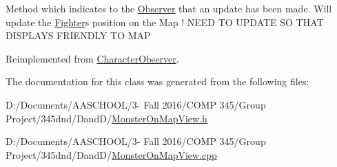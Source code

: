 Method which indicates to the \hyperlink{class_observer}{Observer} that an update has been made. Will update the \hyperlink{class_fighter}{Fighter}\textquotesingle{}s position on the Map ! N\+E\+ED TO U\+P\+D\+A\+TE SO T\+H\+AT D\+I\+S\+P\+L\+A\+YS F\+R\+I\+E\+N\+D\+LY TO M\+AP 

Reimplemented from \hyperlink{class_character_observer_a398d6d784065c7ed36c928d44a574630}{Character\+Observer}.



The documentation for this class was generated from the following files\+:\begin{DoxyCompactItemize}
\item 
D\+:/\+Documents/\+A\+A\+S\+C\+H\+O\+O\+L/3-\/ Fall 2016/\+C\+O\+M\+P 345/\+Group Project/345dnd/\+Dand\+D/\hyperlink{_monster_on_map_view_8h}{Monster\+On\+Map\+View.\+h}\item 
D\+:/\+Documents/\+A\+A\+S\+C\+H\+O\+O\+L/3-\/ Fall 2016/\+C\+O\+M\+P 345/\+Group Project/345dnd/\+Dand\+D/\hyperlink{_monster_on_map_view_8cpp}{Monster\+On\+Map\+View.\+cpp}\end{DoxyCompactItemize}
